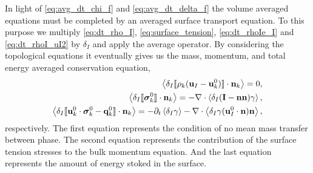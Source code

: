 In light of \ref{eq:avg_dt_chi_f} and \ref{eq:avg_dt_delta_f} the volume averaged equations must be completed by an averaged surface transport equation.  
To this purpose we multiply \ref{eq:dt_rho_I}, \ref{eq:surface_tension}, \ref{eq:dt_rhoIe_I} and \ref{eq:dt_rhoI_uI2} by $\delta_I$ and apply the average operator.
By considering the topological equations it eventually gives us the mass, momentum, and total energy averaged conservation equation, 
\begin{align}
    \label{eq:dt_avg_rho_I}
    \left<\delta_I \llbracket \rho_k (\textbf{u}_I - \textbf{u}_k^0) \rrbracket \cdot \textbf{n}_k\right>
    = 0,\\
    \label{eq:dt_avg_uI}
    \left<\delta_I \llbracket \bm{\sigma}^0_k \rrbracket \cdot \textbf{n}_k\right>
    = - \mathbf{\nabla}\cdot \left<\delta_I (\textbf{I} - \textbf{nn}) \gamma\right>,\\
    \label{eq:dt_avg_gamma}
    \left<\delta_I \llbracket \textbf{u}_k^0 \cdot \bm{\sigma}^0_k - \textbf{q}^0_k \rrbracket \cdot \textbf{n}_k\right>
    = - \partial_t \left<\delta_I \gamma\right>
    - \mathbf{\nabla}\cdot \left<\delta_I \gamma (\textbf{u}_{I}^0 \cdot \textbf{n})\textbf{n} \right>,
\end{align}
respectively. 
The first equation represents the condition of no mean mass transfer between phase.
The second equation represents the contribution of the surface tension stresses to the bulk momentum equation.
And the last equation represents the amount of energy stoked in the surface. 
